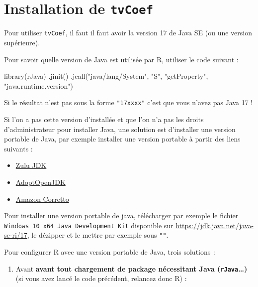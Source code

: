 \documentclass[
  a4paper,
  DIV=11,
  numbers=noendperiod,
  french]{scrartcl}
\newenvironment{Shaded}{\begin{snugshade}}{\end{snugshade}}
\newcommand{\FunctionTok}[1]{\textcolor[rgb]{0.28,0.35,0.67}{#1}}
\newcommand{\NormalTok}[1]{\textcolor[rgb]{0.00,0.23,0.31}{#1}}
\newcommand{\StringTok}[1]{\textcolor[rgb]{0.13,0.47,0.30}{#1}}
\providecommand{\tightlist}{%
  \setlength{\itemsep}{0pt}\setlength{\parskip}{0pt}}\usepackage{longtable,booktabs,array}
\newcommand\1{{\mathds 1}}
\theoremstyle{remark}
\begin{document}
\appendix

\section{\texorpdfstring{Installation de
\texttt{tvCoef}}{Installation de tvCoef}}\label{installation-de-tvcoef}

Pour utiliser \texttt{tvCoef}, il faut il faut avoir la version 17 de
Java SE (ou une version supérieure).

Pour savoir quelle version de Java est utilisée par R, utiliser le code
suivant :

\begin{Shaded}
\begin{Highlighting}[]
\FunctionTok{library}\NormalTok{(rJava)}
\FunctionTok{.jinit}\NormalTok{()}
\FunctionTok{.jcall}\NormalTok{(}\StringTok{"java/lang/System"}\NormalTok{, }\StringTok{"S"}\NormalTok{, }\StringTok{"getProperty"}\NormalTok{, }\StringTok{"java.runtime.version"}\NormalTok{)}
\end{Highlighting}
\end{Shaded}

Si le résultat n'est pas sous la forme \texttt{"17xxxx"} c'est que vous
n'avez pas Java 17 !

Si l'on a pas cette version d'installée et que l'on n'a pas les droits
d'administrateur pour installer Java, une solution est d'installer une
version portable de Java, par exemple installer une version portable à
partir des liens suivants :

\begin{itemize}
\item
  \href{https://www.azul.com/downloads/\#zulu}{Zulu JDK}
\item
  \href{https://adoptopenjdk.net/}{AdoptOpenJDK}
\item
  \href{https://aws.amazon.com/corretto/}{Amazon Corretto}
\end{itemize}

Pour installer une version portable de java, télécharger par exemple le
fichier \texttt{Windows\ 10\ x64\ Java\ Development\ Kit} disponible sur
\url{https://jdk.java.net/java-se-ri/17}, le dézipper et le mettre par
exemple sous \texttt{""}.

Pour configurer R avec une version portable de Java, trois solutions~:

\begin{enumerate}
\def\labelenumi{\arabic{enumi}.}
\tightlist
\item
  Avant \textbf{avant tout chargement de package nécessitant Java
  (\texttt{rJava}\ldots)} (si vous avez lancé le code précédent,
  relancez donc R) :
\end{enumerate}
\end{document}
